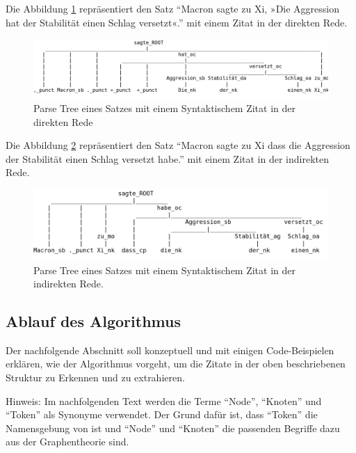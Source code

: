 Die Abbildung \ref{tree-direct} repräsentiert den Satz
\enquote{Macron sagte zu Xi, »Die Aggression hat der Stabilität einen Schlag versetzt«.}
mit einem Zitat in der direkten Rede.

\begin{figure}[H]
	\begin{center}
        \centering
		\includegraphics[width=\linewidth]{./images/macron-sagte-zu-xi-direkt.png}
	\end{center}
\caption{Parse Tree eines Satzes mit einem Syntaktischem Zitat in der direkten Rede}
\label{tree-direct}
\end{figure}

Die Abbildung \ref{tree-indirect} repräsentiert den Satz
\enquote{Macron sagte zu Xi dass die Aggression der Stabilität einen Schlag versetzt habe.}
mit einem Zitat in der indirekten Rede.

\begin{figure}[H]
	\begin{center}
        \centering
		\includegraphics[width=\linewidth]{./images/macron-sagte-zu-xi-indirekt.png}
	\end{center}
\caption{Parse Tree eines Satzes mit einem Syntaktischem Zitat in der indirekten Rede.}
\label{tree-indirect}
\end{figure}

\subsection{Ablauf des Algorithmus}

Der nachfolgende Abschnitt soll konzeptuell und mit einigen Code-Beispielen erklären, wie der
Algorithmus vorgeht, um die Zitate in der oben beschriebenen Struktur zu Erkennen und zu extrahieren.

Hinweis: Im nachfolgenden Text werden die Terme \enquote{Node}, \enquote{Knoten} und \enquote{Token} als Synonyme verwendet.
Der Grund dafür ist, dass \enquote{Token} die Namensgebung von   ist und \enquote{Node} und \enquote{Knoten}
die passenden Begriffe dazu aus der Graphentheorie sind.


